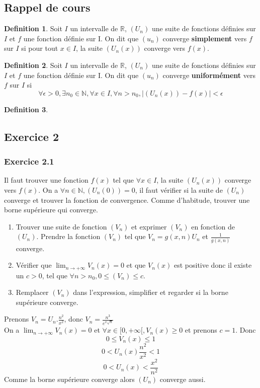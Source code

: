 \documentclass[]{book}
\theoremstyle{definition}
\newtheorem{defn}{Definition}
\newcommand{\bb}[1]{\mathbb{#1}}
\newcommand{\R}{\bb{R}}
\newcommand{\N}{\bb{N}}
\begin{document}
\subsection*{Rappel de cours}
\begin{defn}
Soit $I$ un intervalle de $\R$,  $(U_n)$ une suite de fonctions d\'efinies sur $I$ et $f$ une fonction d\'efinie sur I.
On dit que $(u_n)$ converge \textbf{simplement} vers $f$ sur $I$ si pour tout $x \in I$, la suite $(U_n(x))$ converge vers $f(x)$.
\end{defn}

\begin{defn}
Soit $I$ un intervalle de $\R$,  $(U_n)$ une suite de fonctions d\'efinies sur $I$ et $f$ une fonction d\'efinie sur I.
On dit que $(u_n)$ converge \textbf{uniform\'ement} vers $f$ sur $I$ si
$$\forall \epsilon > 0, \exists n_0 \in \N, \forall x \in I, \forall n > n_0, |(U_n(x)) - f(x)| < \epsilon$$
\end{defn}

\begin{defn}
\end{defn}


\newpage
\subsection*{Exercice 2}
\subsubsection*{Exercice 2.1}
Il faut trouver une fonction $f(x)$ tel que $\forall x \in I$, la suite $(U_n(x))$ converge vers $f(x)$. On a $\forall n \in \N, (U_n(0)) = 0$, il faut v\'erifier si la suite de $(U_n)$ converge et trouver la fonction de convergence. Comme d'habitude, trouver une borne sup\'erieure qui converge. 
\begin{enumerate}
\item Trouver une suite de fonction $(V_n)$ et exprimer $(V_n)$ en fonction de $(U_n)$. Prendre la fonction $(V_n)$ tel que $V_n = g(x,n)U_n$ et $\frac{1}{g(x,n)}$ converge.
\item V\'erifier que $\lim_{n \to +\infty} V_n(x) = 0$ et que $V_n(x)$ est positive donc il existe un $c > 0$, tel que $\forall n>n_0, 0 \leq (V_n) \leq c$.
\item Remplacer $(V_n)$ dans l'expression, simplifier et regarder si la borne sup\'erieure converge.
\end{enumerate}

Prenons $V_n = U_n.\frac{n^2}{x^2}$, donc $V_n = \frac{n^3}{e^{x\sqrt{n}}}$\\
On a $\lim_{n \to +\infty} V_n(x) = 0$ et $\forall x \in [0,+\infty[, V_n(x) \geq 0$ et prenons $c=1$. Donc
$$0 \leq V_n(x) \leq 1$$
$$0 < U_n(x)\frac{n^2}{x^2} < 1$$
$$0 < U_n(x) < \frac{x^2}{n^2}$$
Comme la borne sup\'erieure converge alors $(U_n)$ converge aussi.
\end{document}

